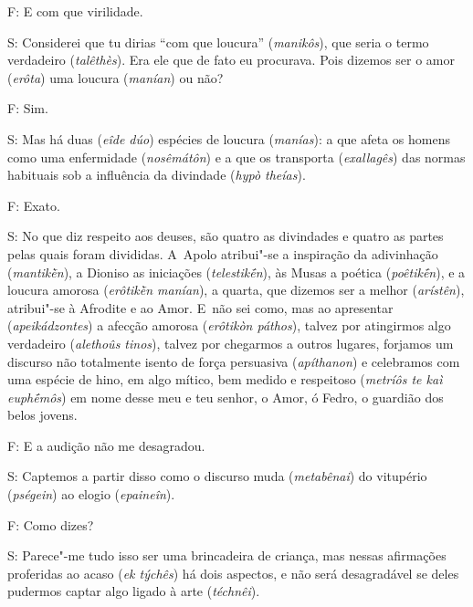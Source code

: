 F: E com que virilidade.

 

S: Considerei que tu dirias ``com que loucura'' (\emph{manikôs}), que
seria o termo verdadeiro (\emph{talêthès}). Era ele que de fato eu
procurava. Pois dizemos ser o amor (\emph{erôta}) uma loucura
(\emph{manían}) ou não?

 

F: Sim.

 

S: Mas há duas (\emph{eîde dúo}) espécies de loucura (\emph{manías}): a
que afeta os homens como uma enfermidade (\emph{nosêmátôn}) e a que os
transporta (\emph{exallagês}) das normas habituais sob a influência da
divindade (\emph{hypò theías}).

 

\bekker{[265b]} F: Exato.

 

S: No que diz respeito aos deuses, são quatro as divindades e quatro as
partes pelas quais foram divididas. A~Apolo atribui"-se a inspiração da
adivinhação (\emph{mantikḕn}), a Dioniso as iniciações
(\emph{telestikḗn}), às Musas a poética (\emph{poêtikḗn}), e a loucura
amorosa (\emph{erôtikḕn manían}), a quarta, que dizemos ser a melhor
(\emph{arístên}), atribui"-se à Afrodite e ao Amor. E~não sei como, mas
ao apresentar (\emph{apeikádzontes}) a afecção amorosa (\emph{erôtikòn
páthos}), talvez por atingirmos algo verdadeiro (\emph{alethoûs tinos}),
talvez por chegarmos a outros lugares, forjamos um discurso não
totalmente isento de força persuasiva (\emph{apíthanon}) e celebramos
com uma espécie de hino, em algo mítico, \bekker{[265c]} bem medido e
respeitoso (\emph{metríôs te kaì euphḗmôs}) em nome desse meu e teu
senhor, o Amor, ó Fedro, o guardião dos belos jovens.

 

F: E a audição não me desagradou.

 

S: Captemos a partir disso como o discurso muda (\emph{metabênai}) do
vitupério (\emph{pségein}) ao elogio (\emph{epaineîn}).

 

F: Como dizes?

 

S: Parece"-me tudo isso ser uma brincadeira de criança, mas nessas
afirmações proferidas ao acaso (\emph{ek týchês}) há dois aspectos, e
não será desagradável se deles pudermos captar algo ligado à arte
(\emph{téchnêi}).

